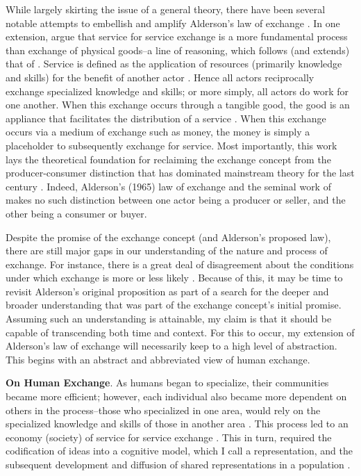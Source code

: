 While largely skirting the issue of a general theory, there have been several notable attempts to embellish and amplify Alderson's law of exchange \citep{bagozzi1978, blalock1979, kotler1984, houston1987}. In one extension, \citet{vargo2004,  vargo2008} argue that service for service exchange is a more fundamental process than exchange of physical goods--a line of reasoning, which follows (and extends) that of \citet{bastiat1848}. Service is defined as the application of resources (primarily knowledge and skills) for the benefit of another actor \citep{vargo2004}. Hence all actors reciprocally exchange specialized knowledge and skills; or more simply, all actors do work for one another. When this exchange occurs through a tangible good, the good is an appliance that facilitates the distribution of a service \citep{vargo2004, vargo2008}. When this exchange occurs via a medium of exchange such as money, the money is simply a placeholder to subsequently exchange for service. Most importantly, this work lays the theoretical foundation for reclaiming the exchange concept from the producer-consumer distinction that has dominated mainstream theory for the last century \citep{vargo2011}. Indeed, Alderson's (1965) law of exchange and the seminal work of \citet{bagozzi1974, bagozzi1975} makes no such distinction between one actor being a producer or seller, and the other being a consumer or buyer. 

Despite the promise of the exchange concept (and Alderson's proposed law), there are still major gaps in our understanding of the nature and process of exchange. For instance, there is a great deal of disagreement about the conditions under which exchange is more or less likely \citep{houston1987}. Because of this, it may be time to revisit Alderson's original proposition as part of a search for the deeper and broader understanding that was part of the exchange concept's initial promise. Assuming such an understanding is attainable, my claim is that it should be capable of transcending both time and context. For this to occur, my extension of Alderson's law of exchange will necessarily keep to a high level of abstraction. This begins with an abstract and abbreviated view of human exchange. 

\textbf{On Human Exchange}.
As humans began to specialize, their communities became more efficient; however, each individual also became more dependent on others in the process--those who specialized in one area, would rely on the specialized knowledge and skills of those in another area \citep{vargo2004, vargo2008, bastiat1848}. This process led to an economy (society) of service for service exchange \citep{vargo2004, vargo2008, lusch2014}. This in turn, required the codification of ideas into a cognitive model, which I call a representation, and the subsequent development and diffusion of shared representations in a population \citep{sperber1985}. 

